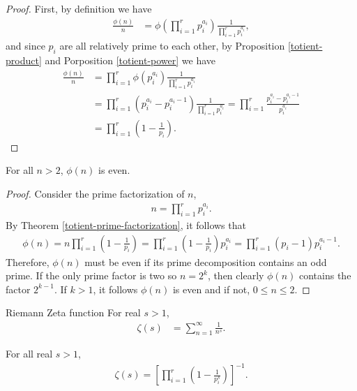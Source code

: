 \begin{proof}
    First, by definition we have
    \begin{align*}
        \frac{\phi(n)}{n} &= \phi\left(\prod_{i=1}^{r}p_i^{a_i}\right)\frac{1}{\prod_{i=1}^{r}p_i^{a_i}},
    \end{align*}
    and since $p_i$ are all relatively prime to each other, by Proposition \ref{totient-product} and Porposition \ref{totient-power} we have
    \begin{align*}
        \frac{\phi(n)}{n} &= \prod_{i=1}^{r}\phi\left(p_i^{a_i}\right)\frac{1}{\prod_{i=1}^{r}p_i^{a_i}} \\
        &= \prod_{i=1}^{r}(p_i^{a_i}-p_i^{a_i-1})\frac{1}{\prod_{i=1}^{r}p_i^{a_i}} = \prod_{i=1}^{r}\frac{p_i^{a_i} - p_i^{a_i-1}}{p_i^{a_i}} \\
        &= \prod_{i=1}^{r}\left(1 - \frac{1}{p_i}\right).
    \end{align*}
\end{proof}

\begin{prop}
    For all $n > 2$, $\phi(n)$ is even.
\end{prop}

\begin{proof}
    Consider the prime factorization of $n$,
    \begin{align*}
        n = \prod_{i=1}^{r}p_i^{a_i}.
    \end{align*}
    By Theorem \ref{totient-prime-factorization}, it follows that
    \begin{align*}
        \phi(n) = n\prod_{i=1}^{r}\left(1 - \frac{1}{p_i}\right) = \prod_{i=1}^{r}\left(1 - \frac{1}{p_i}\right)p_i^{a_i} = \prod_{i=1}^{r}\left(p_i - 1\right)p_i^{a_i-1}.
    \end{align*}
    Therefore, $\phi(n)$ must be even if its prime decomposition contains an odd prime. If the only prime factor is two so $n = 2^{k}$, then clearly $\phi(n)$ contains the factor $2^{k-1}$. If $k > 1$, it follows $\phi(n)$ is even and if not, $0 \leq n \leq 2$.
\end{proof}

\begin{defn}{Riemann Zeta function}\proofbreak
    For real $s > 1$,
    \begin{align*}
        \zeta(s) &= \sum_{n=1}^{\infty}\frac{1}{n^s}.
    \end{align*}
\end{defn}

\begin{lemma}\label{zeta_product}
    For all real $s > 1$,
    \begin{align*}
        \zeta(s) = \left[\prod_{i=1}^{r}\left(1 - \frac{1}{p_i^s}\right)\right]^{-1}.
    \end{align*}
\end{lemma}

